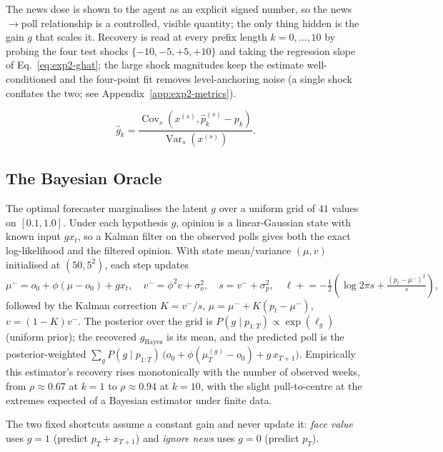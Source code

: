 The news dose is shown to the agent as an explicit signed number, so the
news$\rightarrow$poll relationship is a controlled, visible quantity; the only thing hidden
is the gain $g$ that scales it.  Recovery is read at every prefix length $k=0,\dots,10$ by probing
the four test shocks $\{-10,-5,+5,+10\}$ and taking the regression slope of
Eq.~\eqref{eq:exp2-ghat}; the large shock magnitudes keep the estimate well-conditioned and the
four-point fit removes level-anchoring noise (a single shock conflates the two; see
Appendix~\ref{app:exp2-metrics}).

\begin{equation}
\hat g_k = \frac{\operatorname{Cov}_s(x^{(s)},\hat p_k^{(s)}-p_k)}{\operatorname{Var}_s(x^{(s)})}.
\label{eq:exp2-ghat}
\end{equation}

\subsection{The Bayesian Oracle}
\label{app:exp2-oracle}

The optimal forecaster marginalises the latent $g$ over a uniform grid of $41$ values on
$[0.1,1.0]$.  Under each hypothesis $g$, opinion is a linear-Gaussian state with known input
$g x_t$, so a Kalman filter on the observed polls gives both the exact log-likelihood and the
filtered opinion.  With state mean/variance $(\mu,v)$ initialised at $(50, 5^2)$, each step
updates
\begin{equation}
\mu^- = o_0 + \phi(\mu - o_0) + g x_t,\quad v^- = \phi^2 v + \sigma_o^2,\quad
s = v^- + \sigma_p^2,\quad
\ell \mathrel{+}= -\tfrac12\!\left(\log 2\pi s + \tfrac{(p_t-\mu^-)^2}{s}\right),
\end{equation}
followed by the Kalman correction $K=v^-/s$, $\mu=\mu^-+K(p_t-\mu^-)$, $v=(1-K)v^-$.  The
posterior over the grid is $P(g\mid p_{1:T})\propto \exp(\ell_g)$ (uniform prior); the
recovered $\hat g_{\mathrm{Bayes}}$ is its mean, and the predicted poll is the posterior-weighted
$\sum_g P(g\mid p_{1:T})\,\big(o_0+\phi(\mu_T^{(g)}-o_0) + g\,x_{T+1}\big)$.  Empirically this
estimator's recovery rises monotonically with the number of observed weeks, from
$\rho\approx0.67$ at $k=1$ to $\rho\approx0.94$ at $k=10$, with the slight pull-to-centre at the
extremes expected of a Bayesian estimator under finite data.

The two fixed shortcuts assume a constant gain and never update it: \emph{face value} uses
$g{=}1$ (predict $p_T + x_{T+1}$) and \emph{ignore news} uses $g{=}0$ (predict $p_T$).

